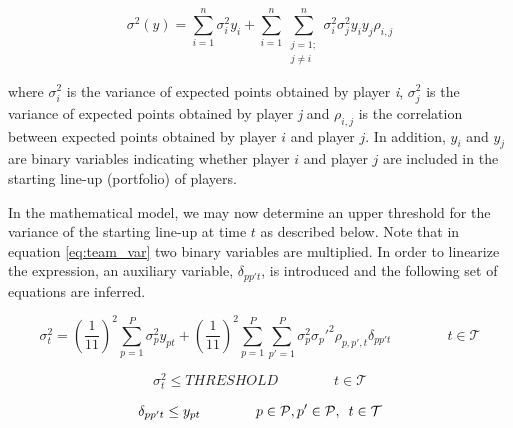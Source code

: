 \begin{equation}
    \sigma^2(y) = \sum_{i = 1}^{n}\sigma_i^2y_i + \sum_{i = 1}^{n}\sum_{\substack{j = 1;\\ j \neq i}}^{n} \sigma_i^{2}\sigma_j^{2}y_{i}y_{j}\rho_{i,j}
    \label{eq:team_var}
\end{equation}

where $\sigma_{i}^2$ is the variance of expected points obtained by player \textit{i}, $\sigma_{j}^2$ is the variance of expected points obtained by player \textit{j} and $\rho_{i,j}$ is the correlation between expected points obtained by player $i$ and player $j$. In addition, $y_i$ and $y_j$ are binary variables indicating whether player $i$ and player $j$ are included in the starting line-up
(portfolio) of players.\newline

In the mathematical model, we may now determine an upper threshold for the variance of the starting line-up at time $t$ as described below. Note that in equation \ref{eq:team_var} two binary variables are multiplied. In order to linearize the expression, an auxiliary variable, $\delta_{pp't}$, is introduced and the following set of equations are inferred.

\begin{equation}
    \sigma^2_{t} = (\frac{1}{11})^2\sum_{p = 1}^{P}\sigma_p^2 y_{pt} + (\frac{1}{11})^2\sum_{p = 1}^{P}\sum_{p' = 1}^{P} \sigma_p^2\sigma_p'^2\rho_{p,p',t} \delta_{pp't} \qquad\qquad t \in \mathcal{T}
\end{equation}

\begin{equation}
    \sigma^2_{t} \leq THRESHOLD \qquad\qquad t \in \mathcal{T}
\end{equation}

\begin{equation}
    \delta_{pp't} \leq y_{pt}  \qquad\qquad p \in \mathcal{P}, p' \in \mathcal{P}, \enskip t \in \mathcal{T}
\end{equation}

